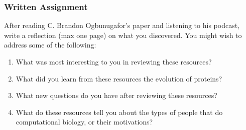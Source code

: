 \documentclass{article}
\begin{document}
\subsubsection*{Written Assignment} 
After reading C. Brandon Ogbunugafor's paper and listening to his podcast, write a reflection (max one page) on what you discovered. You might wish to address some of the following: 

\begin{enumerate}
\item What was most interesting to you in reviewing these resources?
\item What did you learn from these resources the evolution of proteins?
\item What new questions do you have after reviewing these resources?
\item What do these resources tell you about the types of people that do computational biology, or their motivations?
\end{enumerate}

\EndAccSupp{}
\end{document}

